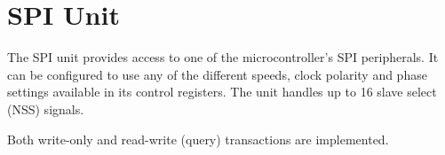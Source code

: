 \section{SPI Unit}

The SPI unit provides access to one of the microcontroller's SPI peripherals. It can be configured to use any of the different speeds, clock polarity and phase settings available in its control registers. The unit handles up to 16 slave select (NSS) signals.

Both write-only and read-write (query) transactions are implemented.

